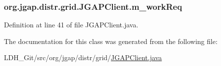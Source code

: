 \hypertarget{classorg_1_1jgap_1_1distr_1_1grid_1_1_j_g_a_p_client_a8961dde85d542276dc4839a199ef4efe}{
\subsubsection[{m\-\_\-work\-Req}]{ org.\-jgap.\-distr.\-grid.\-J\-G\-A\-P\-Client.\-m\-\_\-work\-Req\hspace{0.3cm}{\ttfamily [protected]}}}\label{classorg_1_1jgap_1_1distr_1_1grid_1_1_j_g_a_p_client_a8961dde85d542276dc4839a199ef4efe}


Definition at line 41 of file J\-G\-A\-P\-Client.\-java.



The documentation for this class was generated from the following file\-:\begin{DoxyCompactItemize}
\item 
L\-D\-H\-\_\-\-Git/src/org/jgap/distr/grid/\hyperlink{_j_g_a_p_client_8java}{J\-G\-A\-P\-Client.\-java}\end{DoxyCompactItemize}
